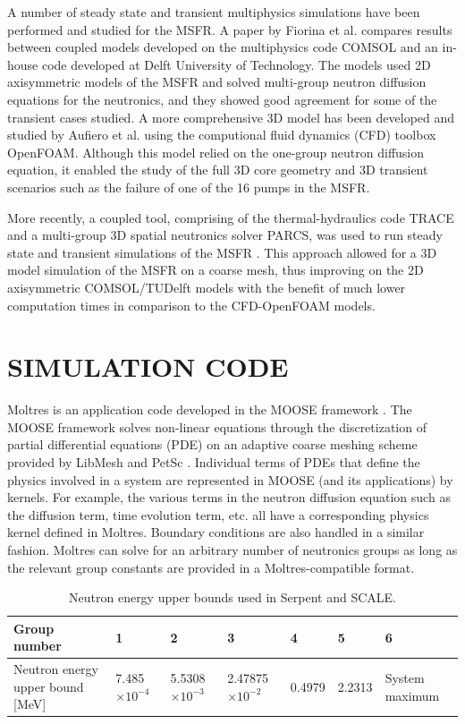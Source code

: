 \documentclass{anstrans}
\begin{document}
A number of steady state and transient multiphysics simulations have been performed and studied for the MSFR. A paper by Fiorina et al. \cite{fiorina_modelling_2014} compares results between coupled models developed on the multiphysics code COMSOL and an in-house code developed at Delft University of Technology. The models used 2D axisymmetric models of the MSFR and solved multi-group neutron diffusion equations for the neutronics, and they showed good agreement for some of the transient cases studied. A more comprehensive 3D model has been developed and studied by Aufiero et al. \cite{aufiero_development_2014} using the computional fluid dynamics (CFD) toolbox OpenFOAM. Although this model relied on the one-group neutron diffusion equation, it enabled the study of the full 3D core geometry and 3D transient scenarios such as the failure of one of the 16 pumps in the MSFR.

More recently, a coupled tool, comprising of the thermal-hydraulics code TRACE and a multi-group 3D spatial neutronics solver PARCS, was used to run steady state and transient simulations of the MSFR \cite{pettersen_coupled_2016}. This approach allowed for a 3D model simulation of the MSFR on a coarse mesh, thus improving on the 2D axisymmetric COMSOL/TUDelft models with the benefit of much lower computation times in comparison to the CFD-OpenFOAM models. 

\section{SIMULATION CODE}

Moltres is an application code developed in the MOOSE framework \cite{gaston_moose:_2009}. The MOOSE framework solves non-linear equations through the discretization of partial differential equations (PDE) on an adaptive coarse meshing scheme provided by LibMesh \cite{kirk_libmesh:_2006} and PetSc \cite{satish_balay_petsc_2015}. Individual terms of PDEs that define the physics involved in a system are represented in MOOSE (and its applications) by kernels. For example, the various terms in the neutron diffusion equation such as the diffusion term, time evolution term, etc. all have a corresponding physics kernel defined in Moltres. Boundary conditions are also handled in a similar fashion. Moltres can solve for an arbitrary number of neutronics groups as long as the relevant group constants are provided in a Moltres-compatible format.

\begin{table}[t]
\centering
\begin{tabular}{ l | l | l | l | l | l | l }
Group number & 1 & 2 & 3 & 4 & 5 & 6\\
\hline
Neutron energy upper bound [MeV] & 7.485$\times 10^{-4}$ & 5.5308$\times 10^{-3}$ &  2.47875$\times 10^{-2}$ & 0.4979 & 2.2313 & System maximum
\end{tabular}
\caption{Neutron energy upper bounds used in Serpent and SCALE.}
\label{table:bound}
\end{table}
\end{document}
